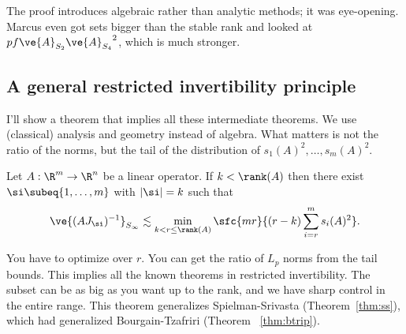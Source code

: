 The proof introduces algebraic rather than analytic methods; it was eye-opening. Marcus even got sets bigger than the stable rank and looked at $pf{\ve{A}_{S_2}}{\ve{A}_{S_4}}^2$, which is much stronger.

\subsection{A general restricted invertibility principle}

I'll show a theorem that implies all these intermediate theorems. We use (classical) analysis and geometry instead of algebra.
What matters is not the ratio of the norms, but the tail of the distribution of $s_1(A)^2,\ldots, s_m(A)^2$.
\begin{thm}
Let $A:\R^m\to \R^n$ be a linear operator. If $k<\rank(A)$  then there exist $\si\subeq \{1,\ldots, m\}$ with $|\si|=k$ such that 
\[
\ve{(AJ_\si)^{-1}}_{S_{\infty}} \lesssim \min_{k<r\le \rank(A)}\sfc{mr}{(r-k) \sum_{i=r}^m s_i(A)^2}.
\]
\end{thm}
You have to optimize over $r$. You can get the ratio of $L_p$ norms from the tail bounds. This implies all the known theorems in restricted invertibility.
The subset can be as big as you want up to the rank, and we have sharp control in the entire range.
This theorem generalizes Spielman-Srivasta (Theorem~\ref{thm:ss}), which had generalized Bourgain-Tzafriri (Theorem ~\ref{thm:btrip}). 

